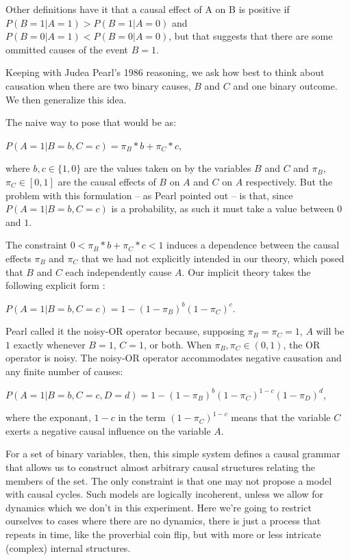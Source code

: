 Other definitions have it that a causal effect of A on B is positive if $P(B = 1 | A = 1) > P(B = 1 | A = 0)$ and $P(B = 0 | A = 1) < P(B = 0 | A = 0)$, but that suggests that there are some ommitted causes of the event $B=1$. 

Keeping with Judea Pearl's 1986 reasoning, we ask how best to think about causation when there are two binary causes, $B$ and $C$ and one binary outcome. We then generalize this idea. 

The naive way to pose that would be as:

$P(A=1|B=b, C=c) = \pi_B*b + \pi_C*c$, 

where $b, c \in \{1, 0\}$ are the values taken on by the variables $B$ and $C$ and $\pi_B$, $\pi_C \in [0,1]$ are the causal effects of $B$ on $A$ and $C$ on $A$ respectively. But the problem with this formulation -- as Pearl pointed out -- is that, since $P(A=1|B=b, C=c)$ is a probability, as such it must take a value between $0$ and $1$.

The constraint $0< \pi_B*b + \pi_C*c <1$ induces a dependence between the causal effects $\pi_B$ and $\pi_C$ that we had not explicitly intended in our theory, which posed that $B$ and $C$ each independently cause $A$. Our implicit theory takes the following explicit form \citep{Pearl88}:

$P(A=1|B=b, C=c) = 1-(1-\pi_B)^b(1-\pi_C)^c$.

Pearl called it the noisy-OR operator because, supposing $\pi_B=\pi_C=1$, $A$ will be $1$ exactly whenever $B=1$, $C=1$, or both.  When $\pi_B, \pi_C \in (0, 1)$, the OR operator is noisy. The noisy-OR operator accommodates negative causation and any finite number of causes: 

$P(A=1|B=b, C=c, D=d) = 1-(1-\pi_B)^b(1-\pi_C)^{1-c}(1-\pi_D)^d$,

where the exponant, $1-c$ in the term $(1-\pi_C)^{1-c}$ means that the variable $C$ exerts a negative causal influence on the variable $A$.

For a set of binary variables, then, this simple system defines a causal grammar that allows us to construct almost arbitrary causal structures relating the members of the set.  The only constraint is that one may not propose a model with causal cycles. Such models are logically incoherent, unless we allow for dynamics which we don't in this experiment. Here we're going to restrict ourselves to cases where there are no dynamics, there is just a process that repeats in time, like the proverbial coin flip, but with more or less intricate (complex) internal structures.

